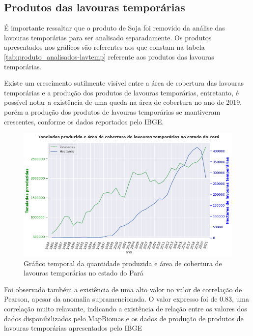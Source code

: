 
\subsection{Produtos das lavouras temporárias}

É importante ressaltar que o produto de Soja foi removido da análise das lavouras temporárias para ser analisado separadamente. Os produtos apresentados nos gráficos são referentes aos que constam na tabela \ref{tab:produto_analisados-lavtemp} referente aos produtos das lavouras temporárias.

Existe um crescimento sutilmente visível entre a área de cobertura das lavouras temporárias e a produção dos produtos de lavouras temporárias, entretanto, é possível notar a existência de uma queda na área de cobertura no ano de 2019, porém a produção dos produtos de lavouras temporárias se mantiveram crescentes, conforme os dados reportados pelo IBGE.

\begin{figure}[hbt!]
    \centering
    \includegraphics[width=0.8\columnwidth]{src/plots/plot-lavouras_temp.png}
    \centering
    \caption{Gráfico temporal da quantidade produzida e área de cobertura de lavouras temporárias no estado do Pará}
    \label{fig:cobertura_pastagem-numero_cabeca}
\end{figure}

Foi observado também a existência de uma alto valor no valor de correlação de Pearson, apesar da anomalia supramencionada. O valor expresso foi de 0.83, uma correlação muito relavante, indicando a existência de relação entre os valores dos dados disponibilizados pelo MapBiomas e os dados de produção de produtos de lavouras temporárias apresentados pelo IBGE

